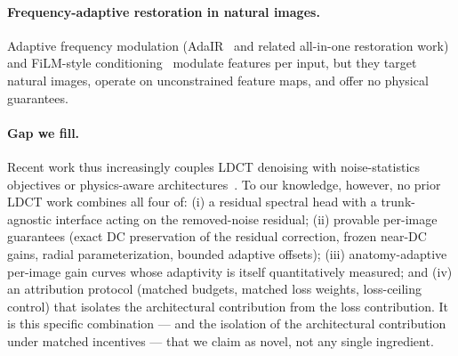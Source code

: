 \paragraph{Frequency-adaptive restoration in natural images.}
Adaptive frequency modulation (AdaIR~\cite{cui2025} and related all-in-one restoration work) and FiLM-style conditioning~\cite{perez2018} modulate features per input, but they target natural images, operate on unconstrained feature maps, and offer no physical guarantees.

\paragraph{Gap we fill.}
Recent work thus increasingly couples LDCT denoising with noise-statistics objectives or physics-aware architectures~\cite{li2025,zhang2025,zhao2026}. To our knowledge, however, no prior LDCT work combines all four of: (i) a residual spectral head with a trunk-agnostic interface acting on the removed-noise residual; (ii) provable per-image guarantees (exact DC preservation of the residual correction, frozen near-DC gains, radial parameterization, bounded adaptive offsets); (iii) anatomy-adaptive per-image gain curves whose adaptivity is itself quantitatively measured; and (iv) an attribution protocol (matched budgets, matched loss weights, loss-ceiling control) that isolates the architectural contribution from the loss contribution. It is this specific combination --- and the isolation of the architectural contribution under matched incentives --- that we claim as novel, not any single ingredient.
